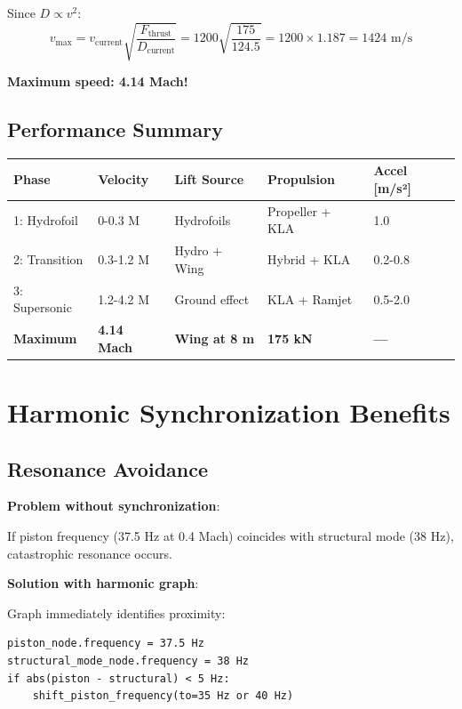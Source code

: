 \documentclass[12pt,a4paper]{article}
\begin{document}
Since $D \propto v^2$:
\begin{equation}
v_{\max} = v_{\text{current}} \sqrt{\frac{F_{\text{thrust}}}{D_{\text{current}}}} = 1200 \sqrt{\frac{175}{124.5}} = 1200 \times 1.187 = 1424 \text{ m/s}
\end{equation}

\textbf{Maximum speed: 4.14 Mach!}

\subsection{Performance Summary}

\begin{center}
\begin{tabular}{|l|l|l|l|l|}
\hline
\textbf{Phase} & \textbf{Velocity} & \textbf{Lift Source} & \textbf{Propulsion} & \textbf{Accel [m/s²]} \\
\hline
1: Hydrofoil & 0-0.3 M & Hydrofoils & Propeller + KLA & 1.0 \\
2: Transition & 0.3-1.2 M & Hydro + Wing & Hybrid + KLA & 0.2-0.8 \\
3: Supersonic & 1.2-4.2 M & Ground effect & KLA + Ramjet & 0.5-2.0 \\
\hline
\textbf{Maximum} & \textbf{4.14 Mach} & \textbf{Wing at 8 m} & \textbf{175 kN} & \textbf{—} \\
\hline
\end{tabular}
\end{center}

\section{Harmonic Synchronization Benefits}

\subsection{Resonance Avoidance}

\textbf{Problem without synchronization}:

If piston frequency (37.5 Hz at 0.4 Mach) coincides with structural mode (38 Hz), catastrophic resonance occurs.

\textbf{Solution with harmonic graph}:

Graph immediately identifies proximity:
\begin{verbatim}
piston_node.frequency = 37.5 Hz
structural_mode_node.frequency = 38 Hz
if abs(piston - structural) < 5 Hz:
    shift_piston_frequency(to=35 Hz or 40 Hz)
\end{verbatim}
\end{document}
